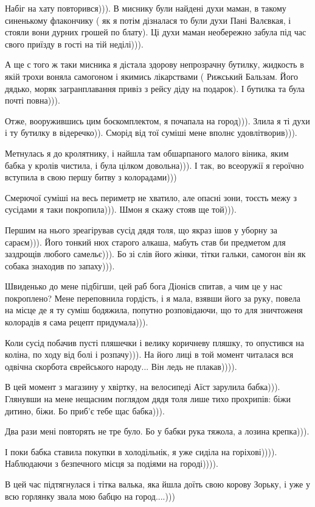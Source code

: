 Набіг на хату повторився))). В миснику були найдені духи маман, в такому
синенькому флакончику ( як я потім дізналася то були духи Пані Валєвкая, і
стояли вони дурних грошей по блату). Ці духи маман необережно забула під час
свого приїзду в гості на тій неділі))). 

А ще с того ж таки мисника я дістала здорову непрозрачну бутилку, жидкость в
якій трохи воняла самогоном і якимись лікарствами ( Рижський Бальзам. Його
дядько, моряк загранплавання привіз з рейсу діду на подарок). І бутилка та була
почті повна))).

Отже, вооружившись цим боєкомплектом, я почапала на город))). Злила я ті духи і
ту бутилку в відеречко)). Сморід від тої суміші мене вполнє удовлітворив))).

Метнулась я до кролятнику, і найшла там обшарпаного малого віника, яким бабка у
кролів чистила, і була цілком довольна))). І так, во всеоружії я героїчно
вступила в свою першу битву з колорадами)))

Смерючої суміші на весь периметр не хватило, але опасні зони, тоєсть межу з
сусідами я таки покропила))). Шмон я скажу  стояв ще той))).

Першим на нього зреагірував сусід дядя толя, що якраз ішов у уборну за
сараєм))). Його тонкий нюх старого алкаша, мабуть став би предметом для
заздрощів любого самельє))). Бо зі слів його жінки, тітки гальки, самогон він
як собака знаходив по запаху))). 

Швиденько до мене підбігши, цей раб бога Діонісв спитав,  а чим це у нас
покроплено? Мене переповнила гордість, і я мала, взявши його за руку, повела на
місце де я ту суміш бодяжила, попутно розповідаючи, що то для зничтоженя
колорадів я сама рецепт придумала))).

Коли сусід побачив пусті пляшечки і велику коричневу пляшку, то опустився на
коліна, по ходу від болі і розпачу))). На його лиці в той момент читалася вся
одвічна скорбота єврейського народу... Він ледь не плакав)))).

В цей момент з магазину у хвіртку, на велосипеді Аїст зарулила бабка))).
Глянувши на мене нещасним поглядом дядя толя лише тихо прохрипів: біжи дитино,
біжи. Бо приб'є тебе щас бабка))).

Два рази мені повторять не тре було. Бо у бабки рука тяжола, а лозина
крепка))).

І поки бабка ставила покупки в холодільнік, я уже сиділа на горіхові)))).
Наблюдаючи з безпечного місця за подіями на городі)))).

В цей час підтягнулася і тітка валька, яка йшла доїть свою корову Зорьку, і уже
у всю горлянку звала мою бабцю на город....)))

